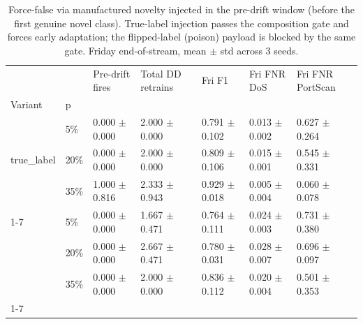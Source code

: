 \begin{table}
\caption{Force-false via manufactured novelty injected in the pre-drift window (before the first genuine novel class). True-label injection passes the composition gate and forces early adaptation; the flipped-label (poison) payload is blocked by the same gate. Friday end-of-stream, mean $\pm$ std across 3 seeds.}
\label{tab:rq3-force-false-prewindow}
\begin{tabular}{lllllll}
\toprule
 &  & Pre-drift fires & Total DD retrains & Fri F1 & Fri FNR DoS & Fri FNR PortScan \\
Variant & p &  &  &  &  &  \\
\midrule
\multirow[t]{3}{*}{true\_label} & 5\% & 0.000 $\pm$ 0.000 & 2.000 $\pm$ 0.000 & 0.791 $\pm$ 0.102 & 0.013 $\pm$ 0.002 & 0.627 $\pm$ 0.264 \\
 & 20\% & 0.000 $\pm$ 0.000 & 2.000 $\pm$ 0.000 & 0.809 $\pm$ 0.106 & 0.015 $\pm$ 0.001 & 0.545 $\pm$ 0.331 \\
 & 35\% & 1.000 $\pm$ 0.816 & 2.333 $\pm$ 0.943 & 0.929 $\pm$ 0.018 & 0.005 $\pm$ 0.004 & 0.060 $\pm$ 0.078 \\
\cline{1-7}
\multirow[t]{3}{*}{flipped\_label} & 5\% & 0.000 $\pm$ 0.000 & 1.667 $\pm$ 0.471 & 0.764 $\pm$ 0.111 & 0.024 $\pm$ 0.003 & 0.731 $\pm$ 0.380 \\
 & 20\% & 0.000 $\pm$ 0.000 & 2.667 $\pm$ 0.471 & 0.780 $\pm$ 0.031 & 0.028 $\pm$ 0.007 & 0.696 $\pm$ 0.097 \\
 & 35\% & 0.000 $\pm$ 0.000 & 2.000 $\pm$ 0.000 & 0.836 $\pm$ 0.112 & 0.020 $\pm$ 0.004 & 0.501 $\pm$ 0.353 \\
\cline{1-7}
\bottomrule
\end{tabular}
\end{table}
